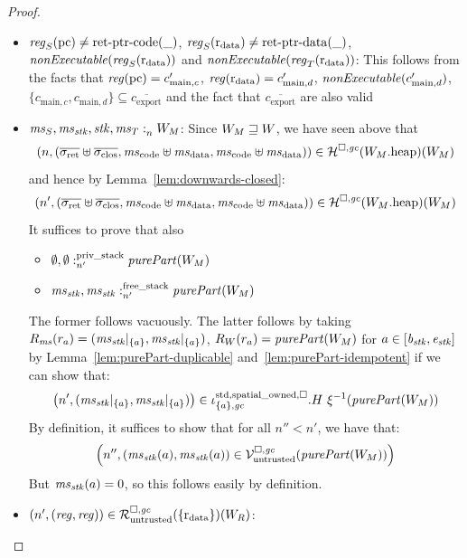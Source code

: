 \documentclass[a4paper]{article}
\begin{document}
\begin{proof}
\begin{itemize}
  \item $\reg_S(\pcreg) \neq \retptrc(\_)$, $\reg_S(\rdata) \neq \retptrd(\_)$, $\nonExec{\reg_S(\rdata)}$ and $\nonExec{\reg_T(\rdata)}$:
    This follows from the facts that $\reg(\pcreg) = c_{\mathrm{main},c}'$, $\reg(\rdata) = c_{\mathrm{main},d}'$, 
    $\nonExec{c_{\mathrm{main},d}'}$, $\{c_{\mathrm{main},c}, c_{\mathrm{main},d}\}\subseteq \overline{c_{\mathrm{export}}}$ and the fact that $\overline{c_{\mathrm{export}}}$ are also valid 

  \item $\mathit{ms}_S,\mathit{ms}_{\mathit{stk}},\mathit{stk},\mathit{ms}_T :_{n}^{}W_M$:
    Since $W_M \sqsupseteq W$, we have seen above that 
    \begin{equation*}
      \npair{(\sigrets\uplus\sigcloss,\mscode\uplus \msdata, \mscode\uplus\msdata)} \in \lrheap(\pwheap[W_M])(W_M)
    \end{equation*}
    and hence by Lemma~\ref{lem:downwards-closed}:
    \begin{equation*}
      \npair[n']{(\sigrets\uplus\sigcloss,\mscode\uplus \msdata, \mscode\uplus\msdata)} \in \lrheap(\pwheap[W_M])(W_M)
    \end{equation*}
    It suffices to prove that also
    \begin{itemize}
    \item $\memSatStack[n']{\emptyset,\emptyset}{\purePart{W_M}}$
    \item $\memSatFStack[n']{\ms_\stk,\ms_\stk}{\purePart{W_M}}$
    \end{itemize}
    The former follows vacuously.
    The latter follows by taking $R_{\mathit{ms}}(r_a) = (\mathit{ms}_{\mathit{stk}}|_{\{a\}},\mathit{ms}_{\mathit{stk}}|_{\{a\}})$, $R_W(r_a) = \purePart{W_M}$ for $a \in [\mathit{b}_{\mathit{stk}},\mathit{e}_{\mathit{stk}}]$ by Lemma~\ref{lem:purePart-duplicable} and~\ref{lem:purePart-idempotent} if we can show that:
    \begin{equation*}
      \npair[n']{(\ms_\stk|_{\{a\}},\ms_\stk|_{\{a\}})} \in \stdreg{\{a\},\gc}{\spatialo}.H~ \xi^{-1}(\purePart{W_M})
    \end{equation*}
    By definition, it suffices to show that for all $n'' < n'$, we have that:
    \begin{equation*}
      \npair[n'']{(\ms_\stk(a),\ms_\stk(a)) \in \lrv(\purePart{W_M})}
    \end{equation*}
    But $\mathit{ms}_{\mathit{stk}}(a) = 0$, so this follows easily by definition.

  \item $\npair[n']{(\reg,\reg)} \in \lrr(\{\rdata\})(W_R)$:
    

\end{itemize}
\end{proof}
\end{document}
